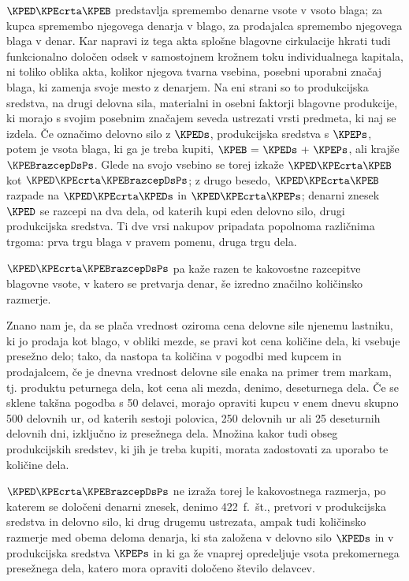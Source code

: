 \documentclass[kapital_02.tex]{subfiles}
\begin{document}
\(\KPED\KPEcrta\KPEB\) predstavlja spremembo denarne vsote v vsoto blaga; za kupca spremembo njegovega denarja v blago, za prodajalca spremembo njegovega blaga v denar. Kar napravi iz tega akta splošne blagovne cirkulacije hkrati tudi funkcionalno določen odsek v samostojnem krožnem toku individualnega kapitala, ni toliko oblika akta, kolikor njegova tvarna vsebina, posebni uporabni značaj blaga, ki zamenja svoje mesto z denarjem. Na eni strani so to produkcijska sredstva, na drugi delovna sila, materialni in osebni faktorji blagovne produkcije, ki morajo s svojim posebnim značajem seveda ustrezati vrsti predmeta, ki naj se izdela. Če označimo delovno silo z \(\KPEDs\), produkcijska sredstva s \(\KPEPs\), potem je vsota blaga, ki ga je treba kupiti, \(\KPEB\textrm{ = }\KPEDs\textrm{ + }\KPEPs\), ali krajše \(\KPEBrazcepDsPs\). Glede na svojo vsebino se torej izkaže \(\KPED\KPEcrta\KPEB\) kot \(\KPED\KPEcrta\KPEBrazcepDsPs\); z drugo besedo, \(\KPED\KPEcrta\KPEB\) razpade na \(\KPED\KPEcrta\KPEDs\) in \(\KPED\KPEcrta\KPEPs\); denarni znesek \(\KPED\) se razcepi na dva dela, od katerih kupi eden delovno silo, drugi produkcijska \KPEstran sredstva. Ti dve vrsi nakupov pripadata popolnoma različnima trgoma: prva trgu blaga v pravem pomenu, druga trgu dela.

\(\KPED\KPEcrta\KPEBrazcepDsPs\) pa kaže razen te kakovostne razcepitve blagovne vsote, v katero se pretvarja denar, še izredno značilno količinsko razmerje.

Znano nam je, da se plača vrednost oziroma cena delovne sile njenemu lastniku, ki jo prodaja kot blago, v obliki mezde, se pravi kot cena količine dela, ki vsebuje presežno delo; tako, da nastopa ta količina v pogodbi med kupcem in prodajalcem, če je dnevna vrednost delovne sile enaka na primer trem markam, tj. produktu peturnega dela, kot cena ali mezda, denimo, deseturnega dela. Če se sklene takšna pogodba s 50 delavci, morajo opraviti kupcu v enem dnevu skupno 500 delovnih ur, od katerih sestoji polovica, 250 delovnih ur ali 25 deseturnih delovnih dni, izključno iz presežnega dela. Množina kakor tudi obseg produkcijskih sredstev, ki jih je treba kupiti, morata zadostovati za uporabo te količine dela.

\(\KPED\KPEcrta\KPEBrazcepDsPs\) ne izraža torej le kakovostnega razmerja, po katerem se določeni denarni znesek, denimo 422\ f.\ št., pretvori v produkcijska sredstva in delovno silo, ki drug drugemu ustrezata, ampak tudi količinsko razmerje med obema deloma denarja, ki sta založena v delovno silo \(\KPEDs\) in v produkcijska sredstva \(\KPEPs\) in ki ga že vnaprej opredeljuje vsota prekomernega presežnega dela, katero mora opraviti določeno število delavcev.
\end{document}
